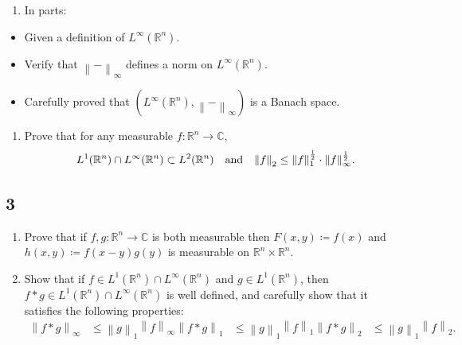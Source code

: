 \begin{enumerate}
\def\labelenumi{\alph{enumi}.}
\tightlist
\item
  In parts:
\end{enumerate}

\begin{itemize}
\tightlist
\item
  Given a definition of \(L^\infty({\mathbb{R}}^n)\).
\item
  Verify that \({\left\lVert {{-}} \right\rVert}_\infty\) defines a norm
  on \(L^\infty({\mathbb{R}}^n)\).
\item
  Carefully proved that
  \((L^\infty({\mathbb{R}}^n), {\left\lVert {{-}} \right\rVert}_\infty)\)
  is a Banach space.
\end{itemize}

\begin{enumerate}
\def\labelenumi{\alph{enumi}.}
\setcounter{enumi}{1}
\tightlist
\item
  Prove that for any measurable \(f:{\mathbb{R}}^n \to {\mathbb{C}}\),
  \begin{align*}
  L^1({\mathbb{R}}^n) \cap L^\infty({\mathbb{R}}^n) \subset L^2({\mathbb{R}}^n) {\quad \operatorname{and} \quad} {\left\lVert {f} \right\rVert}_2 \leq {\left\lVert {f} \right\rVert}_1^{1\over 2} \cdot {\left\lVert {f} \right\rVert}_\infty^{1\over 2}
  .\end{align*}
\end{enumerate}

\hypertarget{section-2}{%
\subsection{3}\label{section-2}}

\begin{enumerate}
\def\labelenumi{\alph{enumi}.}
\item
  Prove that if \(f, g: {\mathbb{R}}^n\to {\mathbb{C}}\) is both
  measurable then \(F(x, y) \coloneqq f(x)\) and
  \(h(x, y)\coloneqq f(x-y) g(y)\) is measurable on
  \({\mathbb{R}}^n\times{\mathbb{R}}^n\).
\item
  Show that if
  \(f\in L^1({\mathbb{R}}^n) \cap L^\infty({\mathbb{R}}^n)\) and
  \(g\in L^1({\mathbb{R}}^n)\), then
  \(f\ast g \in L^1({\mathbb{R}}^n) \cap L^\infty({\mathbb{R}}^n)\) is
  well defined, and carefully show that it satisfies the following
  properties:
  \begin{align*}
  {\left\lVert {f\ast g} \right\rVert}_\infty &\leq {\left\lVert {g} \right\rVert}_1 {\left\lVert {f} \right\rVert}_\infty
  {\left\lVert {f\ast g} \right\rVert}_1      &\leq {\left\lVert {g} \right\rVert}_1 {\left\lVert {f} \right\rVert}_1
  {\left\lVert {f\ast g} \right\rVert}_2      &\leq {\left\lVert {g} \right\rVert}_1 {\left\lVert {f} \right\rVert}_2
  .\end{align*}
\end{enumerate}

